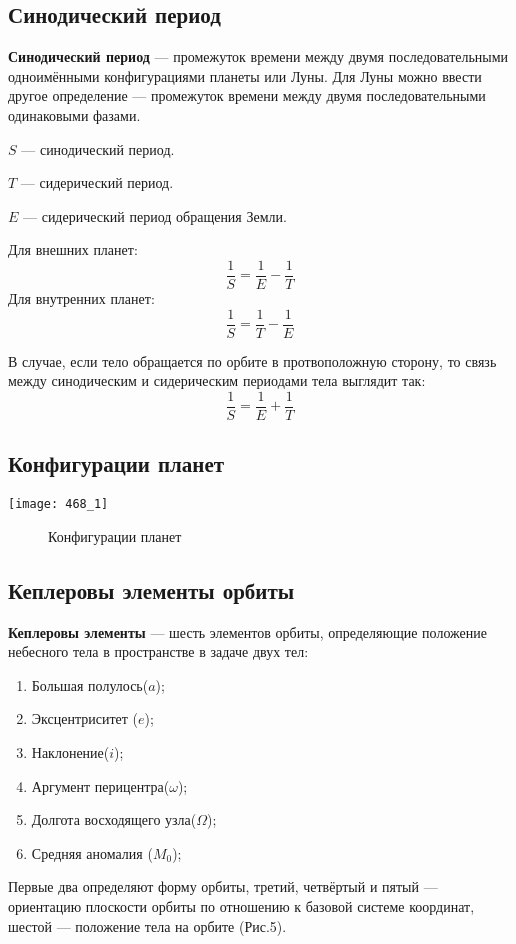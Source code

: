 \documentclass[10pt,a5paper]{article}
\begin{document}
\subsection*{Синодический период}

\textbf{Синодический период} --- промежуток времени между двумя последовательными одноимёнными конфигурациями планеты или Луны. Для Луны можно ввести другое определение --- промежуток времени между двумя последовательными одинаковыми фазами.

$S$ --- синодический период.

$T$ --- сидерический период.

$E$ --- сидерический период обращения Земли.

Для внешних планет:
$$\frac1S=\frac1E-\frac1T$$
Для внутренних планет:
$$\frac1S=\frac1T-\frac1E$$

В случае, если тело обращается по орбите в протвоположную сторону, то связь между синодическим и сидерическим периодами тела выглядит так:
$$\frac1S=\frac1E+\frac1T$$
\subsection*{Конфигурации планет}
\begin{center}
\texttt{[image: 468\_1]}
\begin{figure}[h!]
\caption{Конфигурации планет}
\end{figure}
\end{center}
\subsection*{Кеплеровы элементы орбиты}

\textbf{Кеплеровы элементы} --- шесть элементов орбиты, определяющие положение небесного тела в пространстве в задаче двух тел:
\begin{enumerate}
\item Большая полулось($a$);
\item Эксцентриситет ($e$);
\item Наклонение($i$);
\item Аргумент перицентра($\omega$);
\item Долгота восходящего узла($\Omega$);
\item Средняя аномалия ($M_0$);
\end{enumerate}
Первые два определяют форму орбиты, третий, четвёртый и пятый — ориентацию плоскости орбиты по отношению к базовой системе координат, шестой — положение тела на орбите (Рис.5).
\end{document}
